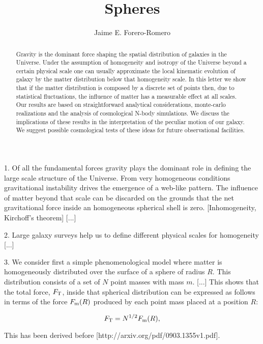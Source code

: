 \documentclass{article}
\title{Spheres}
\author{Jaime E. Forero-Romero}
\begin{document}
\maketitle
\begin{abstract}

Gravity is the dominant force shaping the spatial distribution of galaxies in
the Universe. Under the assumption of homogeneity and isotropy of the Universe
beyond a certain physical scale one can usually approximate the local
kinematic evolution of galaxy by the matter distribution below that
homogeneity scale. In this letter we show that if the matter
distribution is composed by a discrete set of points then, due to
statistical fluctuations, the influence of matter has a measurable
effect at all scales. Our results are based on straightforward
analytical considerations, monte-carlo realizations and the analysis
of cosmological N-body simulations. We discuss the implications of
these results in the interpretation of the peculiar motion of our
galaxy. We suggest possible cosmological tests of these ideas for
future observational facilities. 



\end{abstract}

1. Of all the fundamental forces gravity plays the dominant role in
defining the large scale structure of the Universe. From very
homogeneous conditions gravitational instability drives the emergence
of a web-like pattern. The influence of
matter beyond that scale can be discarded on the grounds that
the net gravitational force inside an homogeneous spherical
shell is zero. [Inhomogeneity, Kirchoff's theorem] [...]



2. Large galaxy surveys help us to define different physical scales for
homogeneity [...]


3. We consider first a simple phenomenological model where matter is
homogeneously distributed over the surface of a sphere of radius
$R$. This distribution consists of a set of $N$ point masses with mass
$m$. [...] This shows that the total force, $F_{\rm T}$, inside that spherical
distribution can be expressed as follows in terms of the force $F_{\rm
m}(R)$ produced by each point mass placed at a position $R$:

\begin{equation}
F_{\rm T } = N^{1/2} F_{\rm m} (R),
\end{equation}

This has been derived before [http://arxiv.org/pdf/0903.1355v1.pdf].
\end{document}
